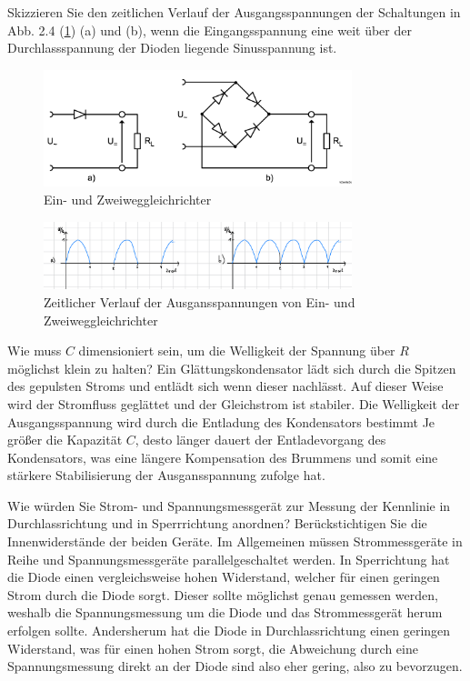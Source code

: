 \documentclass{article}
\theoremstyle{definition}
\begin{document}
\begin{voraufgabe}{Skizzieren Sie den zeitlichen Verlauf der Ausgangsspannungen der Schaltungen in Abb. 2.4 (\ref{fig:Abb2.4}) (a) und (b), wenn die Eingangsspannung eine weit über der Durchlassspannung der Dioden liegende Sinusspannung ist.}
    \begin{figure}[H]
        \centering
        \includegraphics[width=0.8\textwidth]{figs/fig2_4.png}
        \caption{Ein- und Zweiweggleichrichter\cite{anleitung}}
        \label{fig:Abb2.4}
    \end{figure}
    \begin{figure}[H]
        \centering
        \includegraphics[width=0.8\textwidth]{figs/fig2_D.png}
        \caption{Zeitlicher Verlauf der Ausgansspannungen von Ein- und Zweiweggleichrichter}
        \label{figD}
    \end{figure}
\end{voraufgabe}
\begin{voraufgabe}{Wie muss $C$ dimensioniert sein, um die Welligkeit der Spannung über $R$ möglichst klein zu halten?}
Ein Glättungskondensator lädt sich durch die Spitzen des gepulsten Stroms und entlädt sich wenn
dieser nachlässt. Auf dieser Weise wird der Stromfluss geglättet und der Gleichstrom ist stabiler.
Die Welligkeit der Ausgangsspannung wird durch die Entladung des Kondensators bestimmt
Je größer die Kapazität $C$, desto länger dauert der Entladevorgang des Kondensators,
was eine längere Kompensation des Brummens und somit eine stärkere Stabilisierung der 
Ausgansspannung zufolge hat.

\end{voraufgabe}
\label{F}
\begin{voraufgabe}{Wie würden Sie Strom- und Spannungsmessgerät zur Messung der Kennlinie in Durchlassrichtung und in Sperrrichtung anordnen? Berückstichtigen Sie die Innenwiderstände der beiden Geräte.}
Im Allgemeinen müssen Strommessgeräte in Reihe und Spannungsmessgeräte parallelgeschaltet werden. 
In Sperrichtung hat die Diode einen vergleichsweise hohen Widerstand, welcher für einen geringen 
Strom durch die Diode sorgt. Dieser sollte möglichst genau gemessen werden, weshalb die Spannungsmessung 
um die Diode und das Strommessgerät herum erfolgen sollte. Andersherum hat die Diode in Durchlassrichtung 
einen geringen Widerstand, was für einen hohen Strom sorgt, die Abweichung durch eine Spannungsmessung direkt 
an der Diode sind also eher gering, also zu bevorzugen.


\end{voraufgabe}
\end{document}
